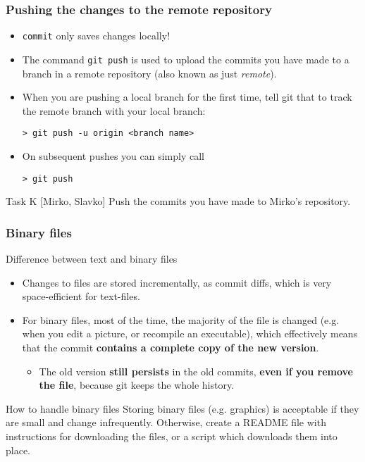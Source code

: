 
\begin{frame}[fragile]
	\frametitle{Pushing the changes to the remote repository}
	
	\begin{itemize}
	\item \texttt{commit} only saves changes \alert{locally}!
	\item The command \texttt{git push} is used to upload the commits you have made to a branch in a remote repository (also known as just \textit{remote}).
	\item When you are pushing a local branch for the first time, tell git that to track the remote branch with your local branch:
	\begin{verbatim}
> git push -u origin <branch name>
	\end{verbatim}
	\item On subsequent pushes you can simply call
	\begin{verbatim}
> git push
	\end{verbatim}
	\end{itemize}

	\begin{block}{Task K [Mirko, Slavko]}
	Push the commits you have made to Mirko's repository.
	\end{block}

\end{frame}


\begin{frame}
	\frametitle{Binary files}
	
	\begin{block}{Difference between text and binary files}
	\begin{itemize}
	\item Changes to files are stored incrementally, as commit diffs, which is very space-efficient for text-files.
    \item For binary files, most of the time, the majority of the file is changed (e.g. when you edit a picture, or recompile an executable), which effectively means that the commit \textbf{contains a complete copy of the new version}.
    \begin{itemize}
    \item The old version \textbf{still persists} in the old commits, \textbf{even if you remove the file}, because git keeps the whole history.
    \end{itemize}
    \end{itemize}
	\end{block}
	
	\begin{block}{How to handle binary files}
	Storing binary files (e.g. graphics) is acceptable if they are small and change infrequently. Otherwise, create a README file with instructions for downloading the files, or a script which downloads them into place.
	\end{block}
\end{frame}

